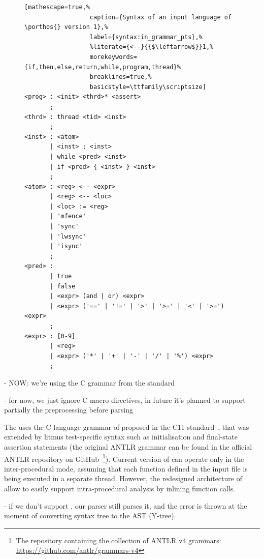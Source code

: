 \begin{figure}%
\begin{lstlisting}[mathescape=true,%
                  caption={Syntax of an input language of \porthos{} version 1},%
                  label={syntax:in_grammar_pts},%
                  %literate={<--}{{$\leftarrow$}}1,%
                  morekeywords={if,then,else,return,while,program,thread}%
                  breaklines=true,%
                  basicstyle=\ttfamily\scriptsize]
<prog> : <init> <thrd>* <assert>
       ;
<thrd> : thread <tid> <inst>
       ;
<inst> : <atom>
       | <inst> ; <inst>
       | while <pred> <inst>
       | if <pred> { <inst> } <inst>
       ;
<atom> : <reg> <-- <expr>
       | <reg> <-- <loc>
       | <loc> := <reg>
       | 'mfence'
       | 'sync'
       | 'lwsync'
       | 'isync'
       ;
<pred> :
       | true
       | false
       | <expr> (and | or) <expr>
       | <expr> ('==' | '!=' | '>' | '>=' | '<' | '>=') <expr>
       ;
<expr> : [0-9]
       | <reg>
       | <expr> ('*' | '+' | '-' | '/' | '%') <expr>
       ;
\end{lstlisting}
\end{figure}


- NOW: we're using the C grammar from the standard

- for now, we just ignore C macro directives, in future it's planned to support partially the preprocessing before parsing

The \porthos[2] uses the C language grammar of proposed in the C11 standard~\cite{jtc2011sc22}, that was extended by litmus test-specific syntax such as initialisation and final-state assertion statements (the original ANTLR grammar can be found in the official ANTLR repository on GitHub~\footnote{The repository containing the collection of ANTLR v4 grammars:\\ \url{https://github.com/antlr/grammars-v4}}).
Current version of \porthos[2] can operate only in the inter-procedural mode, assuming that each function defined in the input file is being executed in a separate thread.
However, the redesigned architecture of \porthos[2] allow to easily support intra-procedural analysis by inlining function calls.


- if we don't support , our parser still parses it, and the error is thrown at the moment of converting syntax tree to the AST (Y-tree).

